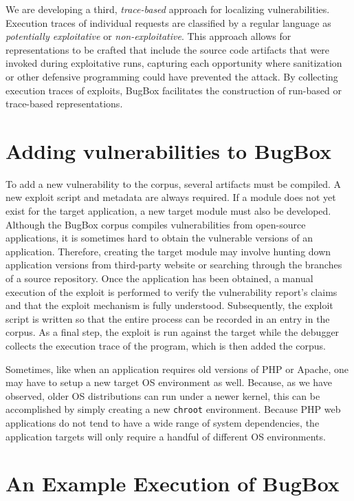 \documentclass[letterpaper,twocolumn,10pt]{article}
\begin{document}
We are developing a third, \textit{trace-based} approach for localizing vulnerabilities. Execution traces of individual requests are classified by a regular language as \emph{potentially exploitative} or \emph{non-exploitative}. This approach allows for representations to be crafted that include the source code artifacts that were invoked during exploitative runs, capturing each opportunity where sanitization or other defensive programming could have prevented the attack. By collecting execution traces of exploits, BugBox facilitates the construction of run-based or trace-based representations.

\section{Adding vulnerabilities to BugBox}

To add a new vulnerability to the corpus, several artifacts must be compiled. A new exploit script and metadata are always required. If a module does not yet exist for the target application, a new target module must also be developed.  Although the BugBox corpus compiles vulnerabilities from open-source applications, it is sometimes hard to obtain the vulnerable versions of an application. Therefore, creating the target module may involve hunting down application versions from third-party website or searching through the branches of a source repository. Once the application has been obtained, a manual execution of the exploit is performed to verify the vulnerability report's claims and that the exploit mechanism is fully understood. Subsequently, the exploit script is written so that the entire process can be recorded in an entry in the corpus. As a final step, the exploit is run against the target while the debugger collects the execution trace of the program, which is then added the corpus.\par

Sometimes, like when an application requires old versions of PHP or Apache, one may have to setup a new target OS environment as well. Because, as we have observed, older OS distributions can run under a newer kernel, this can be accomplished by simply creating a new \texttt{chroot} environment. Because PHP web applications do not tend to have a wide range of system dependencies, the application targets will only require a handful of different OS environments. \par

\section {An Example Execution of BugBox}
\end{document}
